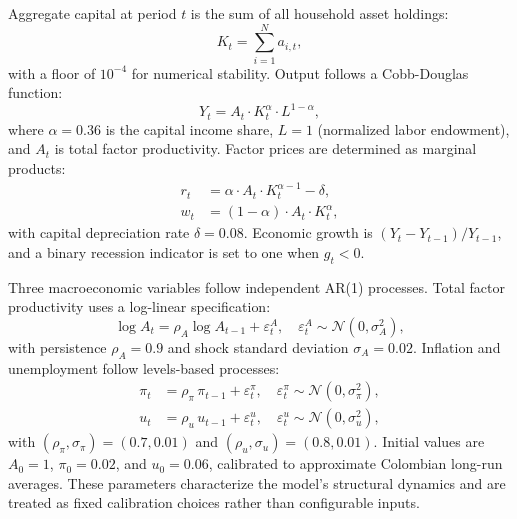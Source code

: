 Aggregate capital at period $t$ is the sum of all household asset holdings:
\begin{equation}
    K_t = \sum_{i=1}^{N} a_{i,t},
    \label{eq:aggregate_capital}
\end{equation}
with a floor of $10^{-4}$ for numerical stability. Output follows a Cobb-Douglas function:
\begin{equation}
    Y_t = A_t \cdot K_t^{\alpha} \cdot L^{1-\alpha},
    \label{eq:cobb_douglas}
\end{equation}
where $\alpha = 0.36$ is the capital income share, $L = 1$ (normalized labor endowment), and $A_t$ is total factor productivity. Factor prices are determined as marginal products:
\begin{align}
    r_t &= \alpha \cdot A_t \cdot K_t^{\alpha - 1} - \delta, \label{eq:interest_rate} \\
    w_t &= (1 - \alpha) \cdot A_t \cdot K_t^{\alpha}, \label{eq:wage}
\end{align}
with capital depreciation rate $\delta = 0.08$. Economic growth is $(Y_t - Y_{t-1}) / Y_{t-1}$, and a binary recession indicator is set to one when $g_t < 0$.

Three macroeconomic variables follow independent AR(1) processes. Total factor productivity uses a log-linear specification:
\begin{equation}
    \log A_t = \rho_A \log A_{t-1} + \varepsilon_t^A, \quad \varepsilon_t^A \sim \mathcal{N}(0, \sigma_A^2),
    \label{eq:ar1_productivity}
\end{equation}
with persistence $\rho_A = 0.9$ and shock standard deviation $\sigma_A = 0.02$. Inflation and unemployment follow levels-based processes:
\begin{align}
    \pi_t &= \rho_\pi \, \pi_{t-1} + \varepsilon_t^\pi, \quad \varepsilon_t^\pi \sim \mathcal{N}(0, \sigma_\pi^2), \label{eq:ar1_inflation} \\
    u_t   &= \rho_u \, u_{t-1} + \varepsilon_t^u, \quad \varepsilon_t^u \sim \mathcal{N}(0, \sigma_u^2), \label{eq:ar1_unemployment}
\end{align}
with $(\rho_\pi, \sigma_\pi) = (0.7, 0.01)$ and $(\rho_u, \sigma_u) = (0.8, 0.01)$. Initial values are $A_0 = 1$, $\pi_0 = 0.02$, and $u_0 = 0.06$, calibrated to approximate Colombian long-run averages. These parameters characterize the model's structural dynamics and are treated as fixed calibration choices rather than configurable inputs.


